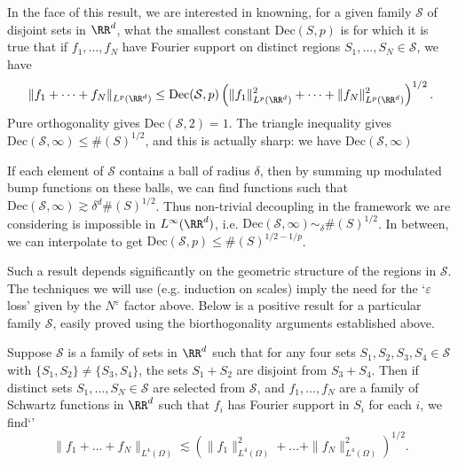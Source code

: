 In the face of this result, we are interested in knowning, for a given family $\mathcal{S}$ of disjoint sets in $\RR^d$, what the smallest constant $\text{Dec}(S,p)$ is for which it is true that if $f_1, \dots, f_N$ have Fourier support on distinct regions $S_1, \dots, S_N \in \mathcal{S}$, we have
%
\[ \| f_1 + \dots + f_N \|_{L^p(\RR^d)} \leq \text{Dec}(\mathcal{S},p) \left( \| f_1 \|_{L^p(\RR^d)}^2 + \dots + \| f_N \|_{L^p(\RR^d)}^2 \right)^{1/2}. \]
%
Pure orthogonality gives $\text{Dec}(\mathcal{S},2) = 1$. The triangle inequality gives $\text{Dec}(\mathcal{S},\infty) \leq \#(S)^{1/2}$, and this is actually sharp: we have $\text{Dec}(\mathcal{S},\infty) $

If each element of $\mathcal{S}$ contains a ball of radius $\delta$, then by summing up modulated bump functions on these balls, we can find functions such that $\text{Dec}(\mathcal{S},\infty) \gtrsim \delta^d \#(S)^{1/2}$. Thus non-trivial decoupling in the framework we are considering is impossible in $L^\infty(\RR^d)$, i.e. $\text{Dec}(\mathcal{S},\infty) \sim_\delta \#(S)^{1/2}$. In between, we can interpolate to get $\text{Dec}(\mathcal{S},p) \leq \#(S)^{1/2 - 1/p}$.

Such a result depends significantly on the geometric structure of the regions in $\mathcal{S}$. The techniques we will use (e.g. induction on scales) imply the need for the `$\varepsilon$ loss' given by the $N^\varepsilon$ factor above. Below is a positive result for a particular family $\mathcal{S}$, easily proved using the biorthogonality arguments established above.

\begin{theorem}
  Suppose $\mathcal{S}$ is a family of sets in $\RR^d$ such that for any four sets $S_1,S_2,S_3,S_4 \in \mathcal{S}$ with $\{ S_1, S_2 \} \neq \{ S_3, S_4 \}$, the sets $S_1 + S_2$ are disjoint from $S_3 + S_4$. Then if distinct sets $S_1, \dots, S_N \in \mathcal{S}$ are selected from $\mathcal{S}$, and $f_1, \dots, f_N$ are a family of Schwartz functions in $\RR^d$ such that $f_i$ has Fourier support in $S_i$ for each $i$, we find`'
  \[ \| f_1 + \dots + f_N \|_{L^4(\Omega)} \lesssim \left( \| f_1 \|_{L^4(\Omega)}^2 + \dots + \| f_N \|_{L^4(\Omega)}^2 \right)^{1/2}. \]
\end{theorem}

